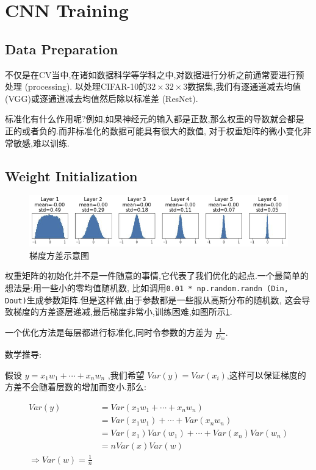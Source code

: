 \section{CNN Training}

\subsection{Data Preparation}

不仅是在CV当中,在诸如数据科学等学科之中,对数据进行分析之前通常要进行预处理 (processing).
以处理CIFAR-10的$32\times32\times3$数据集,我们有逐通道减去均值 (VGG)或逐通道减去均值然后除以标准差 (ResNet).

标准化有什么作用呢?例如,如果神经元的输入都是正数,那么权重的导数就会都是正的或者负的.而非标准化的数据可能具有很大的数值,
对于权重矩阵的微小变化非常敏感,难以训练.

\subsection{Weight Initialization}

\begin{figure}[htbp]
	\includegraphics[scale=0.55]{figures/grad_var.png}
	\caption{梯度方差示意图}
	\label{grad_var}
\end{figure}

权重矩阵的初始化并不是一件随意的事情,它代表了我们优化的起点.一个最简单的想法是:用一些小的零均值随机数,
比如调用\texttt{0.01 * np.random.randn (Din, Dout)}生成参数矩阵.但是这样做,由于参数都是一些服从高斯分布的随机数,
这会导致梯度的方差逐层递减,最后梯度非常小,训练困难,如图所示\ref{grad_var}.

一个优化方法是每层都进行标准化,同时令参数的方差为 $\frac{1}{D_{in}}$.

数学推导:

假设 $y=x_1w_1+\cdots+x_nw_n$ ,我们希望 $Var(y)=Var(x_i)$,这样可以保证梯度的方差不会随着层数的增加而变小.那么:

\begin{equation}
	\begin{aligned}
		Var(y) &= Var(x_1w_1+\cdots+x_nw_n)
		\\
		&= Var(x_1w_1)+\cdots+Var (x_nw_n)
		\\
		&= Var(x_1)Var(w_1)+\cdots+Var(x_n)Var(w_n)
		\\
		&= n Var(x)Var(w)
		\\
		\Rightarrow Var(w)=\frac{1}{n}
	\end{aligned}
\end{equation}

